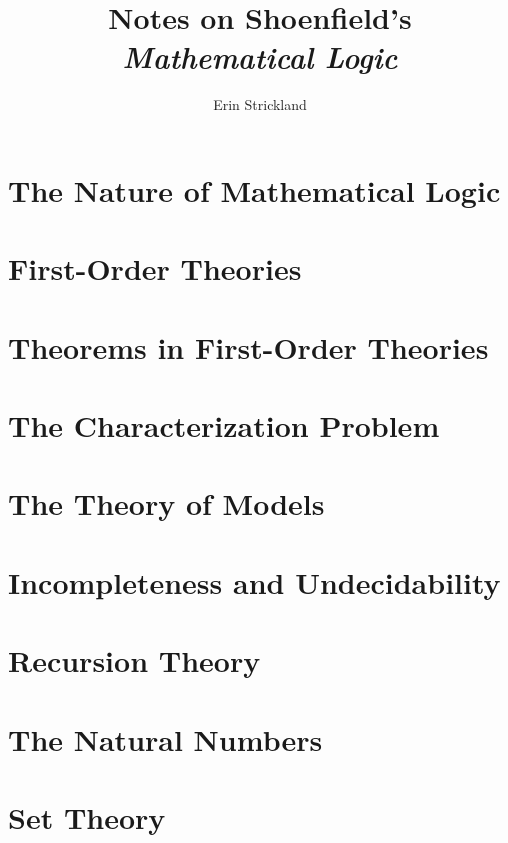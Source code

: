 \documentclass[10pt,twocolumn,leqno]{article}
\author{{Erin Strickland} \\
    \eddress{strickland.g.erin@gmail.com}}
\title{{\vspace*{-1.5in}}Notes on Shoenfield's \\
    \emph{Mathematical Logic}}
\date{\vspace{-2ex}}
\theoremstyle{theorem}
\theoremstyle{example}
\theoremstyle{exercise}
\numberwithin{equation}{subsection}
\begin{document}
\maketitle

\tableofcontents

\section{The Nature of Mathematical Logic}


\section{First-Order Theories}


\section{Theorems in First-Order Theories}


\section{The Characterization Problem}


\section{The Theory of Models}


\section{Incompleteness and Undecidability}


\section{Recursion Theory}


\section{The Natural Numbers}


\section{Set Theory}


\appendix

\end{document}
